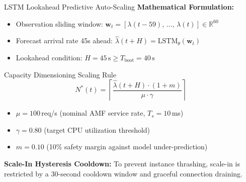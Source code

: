 \documentclass[aspectratio=169,10pt]{beamer}
\begin{document}
\begin{frame}{LSTM Lookahead Predictive Auto-Scaling}
    \textbf{Mathematical Formulation:}
    \begin{itemize}
        \item Observation sliding window: $\mathbf{w}_t = [\lambda(t-59), \, \dots, \, \lambda(t)] \in \mathbb{R}^{60}$
        \item Forecast arrival rate 45s ahead: $\hat{\lambda}(t + H) = \text{LSTM}_{\theta}(\mathbf{w}_t)$
        \item Lookahead condition: $H = 45\,\text{s} \ge T_{\text{boot}} = 40\,\text{s}$
    \end{itemize}

    \vspace{0.2cm}
    \begin{block}{Capacity Dimensioning Scaling Rule}
        $$N^*(t) = \left\lceil \frac{\hat{\lambda}(t + H) \cdot (1 + m)}{\mu \cdot \gamma} \right\rceil$$
        \begin{itemize}
            \item $\mu = 100$\,req/s (nominal AMF service rate, $T_s = 10$\,ms)
            \item $\gamma = 0.80$ (target CPU utilization threshold)
            \item $m = 0.10$ (10\% safety margin against model under-prediction)
        \end{itemize}
    \end{block}

    \vspace{0.1cm}
    \textbf{Scale-In Hysteresis Cooldown:} To prevent instance thrashing, scale-in is restricted by a 30-second cooldown window and graceful connection draining.
\end{frame}
\end{document}
